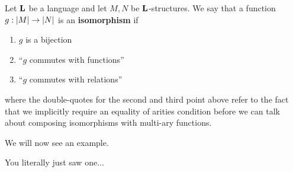 \begin{boxdefinition}[Isomorphism]
    Let $\mathbf{L}$ be a language and let $M, N$ be $\mathbf{L}$-structures. We say that a function $g : \left\lvert M \right\rvert \to \left\lvert N \right\rvert$ is an \textbf{isomorphism} if
    \begin{enumerate}
        \item $g$ is a bijection
        \item ``$g$ commutes with functions''
        \item ``$g$ commutes with relations''
    \end{enumerate}
    where the double-quotes for the second and third point above refer to the fact that we implicitly require an equality of arities condition before we can talk about composing isomorphisms with multi-ary functions.
\end{boxdefinition}

We will now see an example.

\begin{boxexample}[A Definition]
    You literally just saw one...
\end{boxexample}